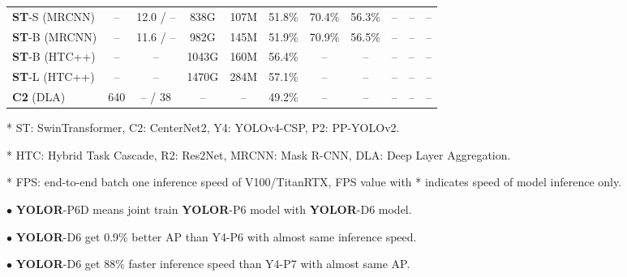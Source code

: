 \documentclass[10pt,twocolumn,letterpaper]{article}
\begin{document}
\begin{table*}[t]
\begin{threeparttable}[t]
\begin{tabular}{lcccccccccc}
		\textbf{ST}-S (MRCNN) & -- & 12.0 / -- & 838G & 107M & 51.8\% & 70.4\% & 56.3\% & -- & -- & -- \\
		\textbf{ST}-B (MRCNN) & -- & 11.6 / -- & 982G & 145M & 51.9\% & 70.9\% & 56.5\% & -- & -- & -- \\
		\textbf{ST}-B (HTC++) & -- & -- & 1043G & 160M & 56.4\% & -- & -- & -- & -- & -- \\
		\textbf{ST}-L (HTC++) & -- & -- & 1470G & 284M & 57.1\% & -- & -- & -- & -- & -- \\
		\midrule
		\textbf{C2} (DLA) & 640 & -- / 38 & -- & -- & 49.2\% & -- & -- & -- & -- & -- \\
		\bottomrule
	\end{tabular}
	\begin{tablenotes}[flushleft]
		\footnotesize
		\item[*] ST: SwinTransformer, C2: CenterNet2, Y4: YOLOv4-CSP, P2: PP-YOLOv2.
		\item[*] HTC: Hybrid Task Cascade, R2: Res2Net, MRCNN: Mask R-CNN, DLA: Deep Layer Aggregation.
		\item[*] FPS: end-to-end batch one inference speed of V100/TitanRTX, FPS value with * indicates speed of model inference only.
		\item[$\bullet$] \textbf{YOLOR}-P6D means joint train \textbf{YOLOR}-P6 model with \textbf{YOLOR}-D6 model.
		\item[$\bullet$] \textbf{YOLOR}-D6 get 0.9\% better AP than Y4-P6 with almost same inference speed.
		\item[$\bullet$] \textbf{YOLOR}-D6 get 88\% faster inference speed than Y4-P7 with almost same AP.
	\end{tablenotes}
\end{threeparttable}
\end{table*}
\end{document}
